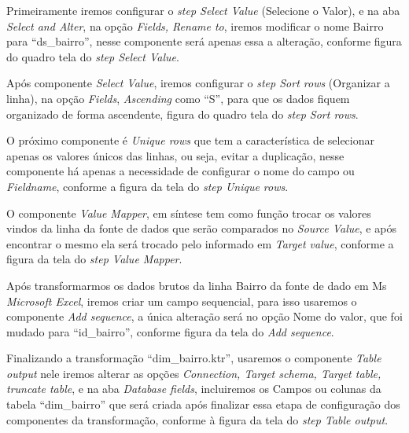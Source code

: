 Primeiramente iremos configurar o \textit{step Select Value} (Selecione o Valor), e na aba \textit{Select and Alter}, na op\c{c}\~{a}o \textit{Fields, Rename to}, iremos modificar o nome Bairro para ``ds\_bairro'', nesse componente ser\'{a} apenas essa a altera\c{c}\~{a}o, conforme figura do quadro tela do \textit{step Select Value}.

Ap\'os  componente \textit{Select Value}, iremos configurar o \textit{step Sort rows} (Organizar a linha), na op\c{c}\~{a}o \textit{Fields}, \textit{Ascending} como ``S'', para que os dados fiquem organizado de forma ascendente, figura do quadro tela do \textit{step Sort rows}.

O pr\'oximo componente \'{e} \textit{Unique rows} que tem a caracter\'{i}stica de selecionar apenas os valores únicos das linhas, ou seja, evitar a duplica\c{c}\~{a}o, nesse componente h\'{a} apenas a necessidade de configurar o nome do campo ou \textit{Fieldname}, conforme a figura da tela do \textit{step Unique rows}.

O componente \textit{Value Mapper}, em s\'{i}ntese tem como fun\c{c}\~{a}o trocar os valores vindos da linha da fonte de dados que ser\~{a}o comparados no \textit{Source Value}, e ap\'os encontrar o mesmo ela ser\'{a} trocado pelo informado em \textit{Target value}, conforme a figura da tela do \textit{step Value Mapper}.

Ap\'os transformarmos os dados brutos da linha Bairro da fonte de dado em Ms \textit{Microsoft Excel}, iremos criar um campo sequencial, para isso usaremos o componente \textit{Add sequence}, a única altera\c{c}\~{a}o ser\'{a} no op\c{c}\~{a}o Nome do valor, que foi mudado para ``id\_bairro'', conforme figura da tela do \textit{Add sequence}.

Finalizando a transforma\c{c}\~{a}o ``dim\_bairro.ktr'', usaremos o componente \textit{Table output} nele iremos alterar as op\c{c}\~{o}es \textit{Connection, Target schema, Target table, truncate table}, e na aba \textit{Database fields}, incluiremos os Campos ou colunas da tabela ``dim\_bairro'' que ser\'{a} criada ap\'os finalizar essa etapa de configura\c{c}\~{a}o dos componentes da transforma\c{c}\~{a}o, conforme \`{a} figura da tela do \textit{step Table output}.

